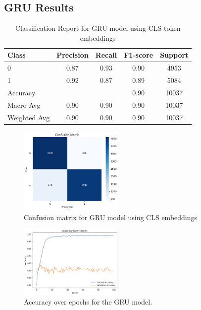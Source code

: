 \subsection{GRU Results}

\begin{table}[H]
\centering
\caption{Classification Report for GRU model using CLS token embeddings}
\label{tab:gru_classification_report}
\begin{tabular}{lcccc}
\toprule
Class        & Precision & Recall & F1-score & Support \\
\midrule
0            & 0.87      & 0.93   & 0.90     & 4953    \\
1            & 0.92      & 0.87   & 0.89     & 5084    \\
\midrule
Accuracy     &           &        & 0.90     & 10037   \\
Macro Avg    & 0.90      & 0.90   & 0.90     & 10037   \\
Weighted Avg & 0.90      & 0.90   & 0.90     & 10037   \\
\bottomrule
\end{tabular}
\end{table}

\begin{figure}[H]
    \centering
    \includegraphics[width=0.45\textwidth]{images/confusion_matrix_gru.png}
    \caption{Confusion matrix for GRU model using CLS embeddings}
    \label{fig:confusion_gru}
\end{figure}

\begin{figure}[H]
    \centering
    \includegraphics[width=0.45\textwidth]{images/accuracy_over_epoch_gru.png}
    \caption{Accuracy over epochs for the GRU model.}
    \label{fig:accuracy_gru}
\end{figure}

